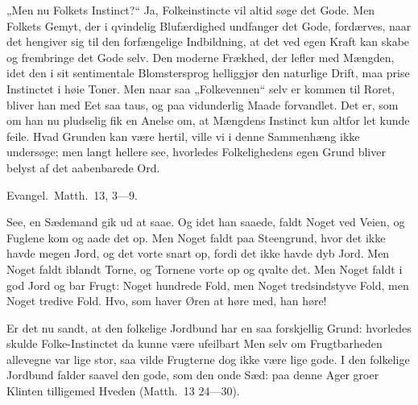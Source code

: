\documentclass[12pt,a4paper]{book}
\begin{document}
„Men nu Folkets Instinct?“ Ja, Folkeinstincte vil altid søge det Gode. Men Folkets Gemyt,
der i qvindelig Blufærdighed undfanger det Gode, fordærves, naar det hengiver sig til den
forfængelige Indbildning, at det ved egen Kraft kan skabe og frembringe det Gode selv. Den
moderne Frækhed, der lefler med Mængden, idet den i sit sentimentale Blomstersprog
helliggjør den naturlige Drift, maa prise Instinctet i høie Toner. Men naar saa
„Folkevennen“ selv er kommen til Roret, bliver han med Eet
saa taus, og paa vidunderlig Maade forvandlet. Det er, som om han nu pludselig fik en
Anelse om, at Mængdens Instinct kun altfor let kunde feile. Hvad Grunden kan være hertil,
ville vi i denne Sammenhæng ikke undersøge; men langt hellere see, hvorledes
Folkelighedens egen Grund bliver belyst af det aabenbarede Ord.

{\small Evangel.\ Matth.\ 13, 3---9.}

\begingroup\large
See, en Sædemand gik ud at saae. Og idet han saaede, faldt Noget ved Veien, og Fuglene kom
og aade det op. Men Noget faldt paa Steengrund, hvor det ikke havde megen Jord, og det
vorte snart op, fordi det ikke havde dyb Jord. Men Noget faldt iblandt Torne, og Tornene
vorte op og qvalte det. Men Noget faldt i god Jord og bar Frugt: Noget hundrede Fold, men
Noget tredsindstyve Fold, men Noget tredive Fold. Hvo, som haver Øren at høre med, han
høre!
\par\endgroup

Er det nu sandt, at den folkelige Jordbund har en saa forskjellig Grund: hvorledes skulde
Folke-Instinctet da kunne være ufeilbart Men selv om Frugtbarheden allevegne var lige
stor, saa vilde Frugterne dog ikke være lige gode. I den folkelige Jordbund falder saavel
den gode, som den onde Sæd: paa denne Ager groer Klinten tilligemed Hveden (Matth.\ 13
24---30).
\end{document}
